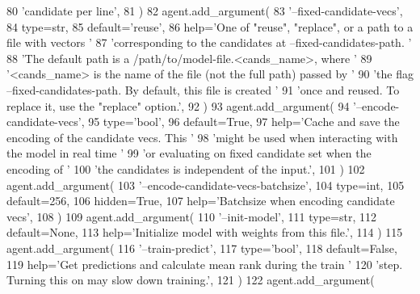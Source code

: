 \begin{DoxyCode}
80             \textcolor{stringliteral}{'candidate per line'},
81         )
82         agent.add\_argument(
83             \textcolor{stringliteral}{'--fixed-candidate-vecs'},
84             type=str,
85             default=\textcolor{stringliteral}{'reuse'},
86             help=\textcolor{stringliteral}{'One of "reuse", "replace", or a path to a file with vectors '}
87             \textcolor{stringliteral}{'corresponding to the candidates at --fixed-candidates-path. '}
88             \textcolor{stringliteral}{'The default path is a /path/to/model-file.<cands\_name>, where '}
89             \textcolor{stringliteral}{'<cands\_name> is the name of the file (not the full path) passed by '}
90             \textcolor{stringliteral}{'the flag --fixed-candidates-path. By default, this file is created '}
91             \textcolor{stringliteral}{'once and reused. To replace it, use the "replace" option.'},
92         )
93         agent.add\_argument(
94             \textcolor{stringliteral}{'--encode-candidate-vecs'},
95             type=\textcolor{stringliteral}{'bool'},
96             default=\textcolor{keyword}{True},
97             help=\textcolor{stringliteral}{'Cache and save the encoding of the candidate vecs. This '}
98             \textcolor{stringliteral}{'might be used when interacting with the model in real time '}
99             \textcolor{stringliteral}{'or evaluating on fixed candidate set when the encoding of '}
100             \textcolor{stringliteral}{'the candidates is independent of the input.'},
101         )
102         agent.add\_argument(
103             \textcolor{stringliteral}{'--encode-candidate-vecs-batchsize'},
104             type=int,
105             default=256,
106             hidden=\textcolor{keyword}{True},
107             help=\textcolor{stringliteral}{'Batchsize when encoding candidate vecs'},
108         )
109         agent.add\_argument(
110             \textcolor{stringliteral}{'--init-model'},
111             type=str,
112             default=\textcolor{keywordtype}{None},
113             help=\textcolor{stringliteral}{'Initialize model with weights from this file.'},
114         )
115         agent.add\_argument(
116             \textcolor{stringliteral}{'--train-predict'},
117             type=\textcolor{stringliteral}{'bool'},
118             default=\textcolor{keyword}{False},
119             help=\textcolor{stringliteral}{'Get predictions and calculate mean rank during the train '}
120             \textcolor{stringliteral}{'step. Turning this on may slow down training.'},
121         )
122         agent.add\_argument(

\end{DoxyCode}
